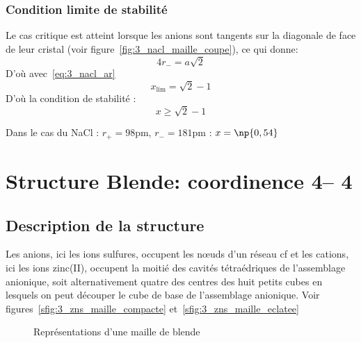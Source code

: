 \subsubsection{Condition limite de stabilité}
Le cas critique est atteint lorsque les anions sont tangents sur la diagonale de face
de leur cristal (voir figure~\ref{fig:3_nacl_maille_coupe}), ce qui donne:
\begin{equation}
    4r_- = a\sqrt{2}
    \label{eq:3_limite_ar-}
\end{equation}
D'où avec~\ref{eq:3_nacl_ar}
\begin{equation}
    x_\text{lim} = \sqrt{2} - 1
\end{equation}
D'où la condition de stabilité :
\begin{equation}
    \boxed{x \geq \sqrt{2} - 1}
    \label{eq:3_stab_x}
\end{equation}

Dans le cas du NaCl : $r_+ = 98$pm, $r_- = 181$pm : $x = \np{0,54}$



\section{Structure Blende: coordinence 4\--- 4}
\subsection{Description de la structure}
Les anions, ici les ions sulfures, occupent les n\oe uds d'un réseau cf et les cations,
ici les ions zinc(II), occupent la moitié des cavités tétraédriques
 de l’assemblage
anionique, soit alternativement quatre des centres des huit petits cubes en lesquels on peut
découper le cube de base de l’assemblage anionique. Voir figures~\ref{sfig:3_zns_maille_compacte}
et~\ref{sfig:3_zns_maille_eclatee}
\begin{figure}
    \centering
    \qquad
    \qquad
    \caption{Représentations d'une maille de blende}\label{fig:3_zns}
\end{figure}



